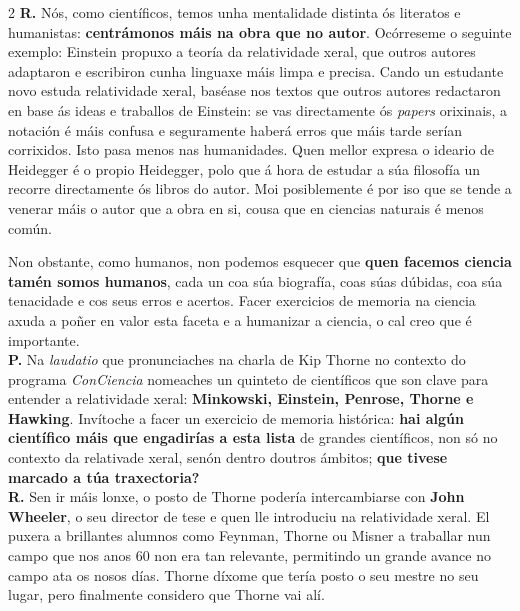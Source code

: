 \begin{refsection}
\begin{multicols}{2}
\noindent \textbf{R.} \hspace{5px} Nós, como científicos, temos unha mentalidade distinta ós literatos e humanistas: \textbf{centrámonos máis na obra que no autor}. %
Ocórreseme o seguinte exemplo: Einstein propuxo a teoría da relatividade xeral, que outros autores adaptaron e escribiron cunha linguaxe máis limpa e precisa. Cando un estudante novo estuda relatividade xeral, baséase nos textos que outros autores redactaron en base ás ideas e traballos de Einstein: se vas directamente ós \textit{papers} orixinais, a notación é máis confusa e seguramente haberá erros que máis tarde serían corrixidos. Isto pasa menos nas humanidades. Quen mellor expresa o ideario de Heidegger é o propio Heidegger, polo que á hora de estudar a súa filosofía un recorre directamente ós libros do autor. Moi posiblemente é por iso que se tende a venerar máis o autor que a obra en si, cousa que en ciencias naturais é menos común.

Non obstante, como humanos, non podemos esquecer que \textbf{quen facemos ciencia tamén somos humanos}, cada un coa súa biografía, coas súas dúbidas, coa súa tenacidade e cos seus erros e acertos. Facer exercicios de memoria na ciencia axuda a poñer en valor esta faceta e a humanizar a ciencia, o cal creo que é importante.\\

\noindent \textbf{P.} \hspace{5px} Na \emph{laudatio} que pronunciaches na charla de Kip Thorne no contexto do programa \textit{ConCiencia} nomeaches un quinteto de científicos que son clave para entender a relatividade xeral: \textbf{Minkowski, Einstein, Penrose, Thorne e Hawking}. Invítoche a facer un exercicio de memoria histórica: \textbf{hai algún científico máis que engadirías a esta lista} de grandes científicos, non só no contexto da relativade xeral, senón dentro doutros ámbitos; \textbf{que tivese marcado a túa traxectoria?}\\

\noindent \textbf{R.} \hspace{5px} Sen ir máis lonxe, o posto de Thorne podería intercambiarse con \textbf{John Wheeler}, o seu director de tese e quen lle introduciu na relatividade xeral. El puxera a brillantes alumnos como Feynman, Thorne ou Misner a traballar nun campo que nos anos 60 non era tan relevante, permitindo un grande avance no campo ata os nosos días. Thorne díxome que tería posto o seu mestre no seu lugar, pero finalmente considero que Thorne vai alí.


\end{multicols}
\end{refsection}
